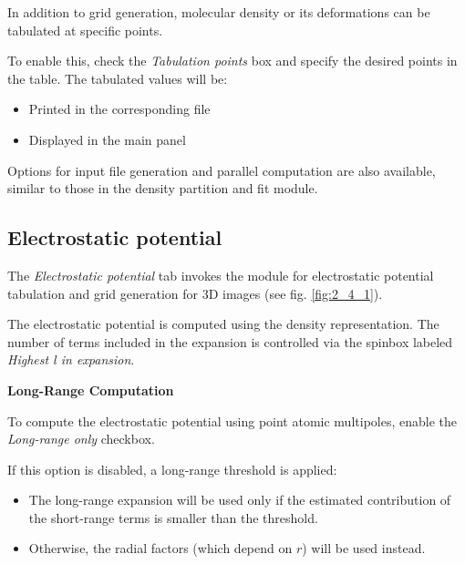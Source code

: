 \documentclass[10pt]{article}
\begin{document}
In addition to grid generation, molecular density or its deformations
can be tabulated at specific points.

To enable this, check the {\it Tabulation points} box and specify the desired points in the table.
The tabulated values will be:

\begin{itemize}
\item Printed in the corresponding \out{ } file
\item Displayed in the main panel
\end{itemize}

Options for input file generation and parallel computation
are also available, similar to those in the density partition and fit module.

\subsection{Electrostatic potential \label{sec:2.4}}

The {\it Electrostatic potential} tab invokes the module for electrostatic potential tabulation
and grid generation for 3D images (see fig. \ref{fig:2_4_1}).

The electrostatic potential is computed using the density representation.
The number of terms included in the expansion is controlled via the spinbox labeled {\it Highest l in expansion}.

\vspace*{3mm}
{\bf Long-Range Computation}
\vspace*{3mm}

To compute the electrostatic potential using point atomic multipoles,
enable the {\it Long-range only} checkbox.

If this option is disabled, a long-range threshold is applied:

\begin{itemize}
\item The long-range expansion will be used only if the estimated contribution of the short-range terms
is smaller than the threshold.
\item Otherwise, the radial factors (which depend on $r$) will be used instead.
\end{itemize}
\end{document}

